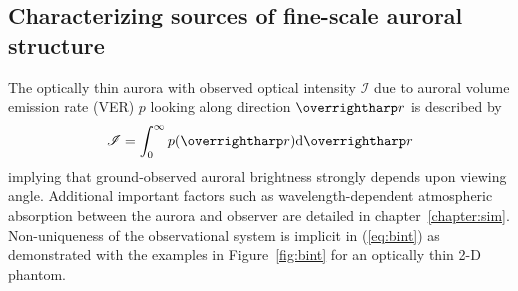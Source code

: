 \FloatBarrier
\subsection{Characterizing sources of fine-scale auroral structure}\label{sec:aurorabasic}
The optically thin aurora with observed optical intensity $\mathscr{I}$ due to auroral volume emission rate (VER) $p$ looking along direction $\vect{r}$ is described by
\begin{equation}\label{eq:bint}
\mathscr{I} = \int_0^\infty p(\vect{r})\textrm{d}\vect{r}
\end{equation}
implying that ground-observed auroral brightness strongly depends upon viewing angle.
Additional important factors such as wavelength-dependent atmospheric absorption between the aurora and observer are detailed in chapter~\ref{chapter:sim}.
Non-uniqueness of the observational system is implicit in (\ref{eq:bint}) as demonstrated with the examples in Figure~\ref{fig:bint} for an optically thin 2-D phantom. 
